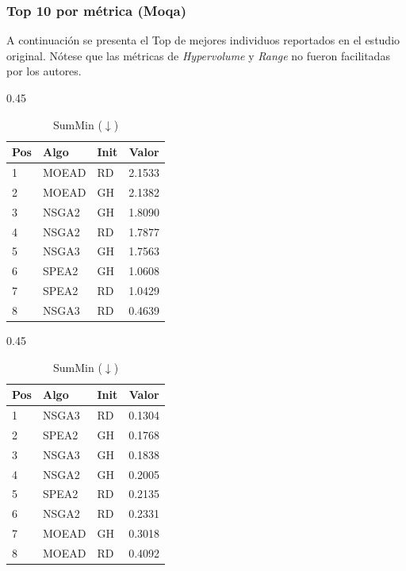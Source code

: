 \documentclass[a4paper,10pt]{article} %
\begin{document}
\subsubsection{Top 10 por métrica (Moqa)}
A continuación se presenta el Top de mejores individuos reportados en el estudio original. Nótese que las métricas de \textit{Hypervolume} y \textit{Range} no fueron facilitadas por los autores.

\begin{table}[H]
    \centering
    \begin{subtable}[t]{0.45\textwidth}
        \centering
        \caption{Range ($\uparrow$)}
        \begin{tabular}{lllc}
            \toprule
            Pos & Algo & Init & Valor \\
            \midrule
            1 & MOEAD & RD & 2.1533 \\
            2 & MOEAD & GH & 2.1382 \\
            3 & NSGA2 & GH & 1.8090 \\
            4 & NSGA2 & RD & 1.7877 \\
            5 & NSGA3 & GH & 1.7563 \\
            6 & SPEA2 & GH & 1.0608 \\
            7 & SPEA2 & RD & 1.0429 \\
            8 & NSGA3 & RD & 0.4639 \\
            \bottomrule
        \end{tabular}
    \end{subtable}
    \hfill
    \begin{subtable}[t]{0.45\textwidth}
        \centering
        \caption{SumMin ($\downarrow$)}
        \begin{tabular}{lllc}
            \toprule
            Pos & Algo & Init & Valor \\
            \midrule
            1 & NSGA3 & RD & 0.1304 \\
            2 & SPEA2 & GH & 0.1768 \\
            3 & NSGA3 & GH & 0.1838 \\
            4 & NSGA2 & GH & 0.2005 \\
            5 & SPEA2 & RD & 0.2135 \\
            6 & NSGA2 & RD & 0.2331 \\
            7 & MOEAD & GH & 0.3018 \\
            8 & MOEAD & RD & 0.4092 \\
            \bottomrule
        \end{tabular}
    \end{subtable}
\end{table}
\end{document}
